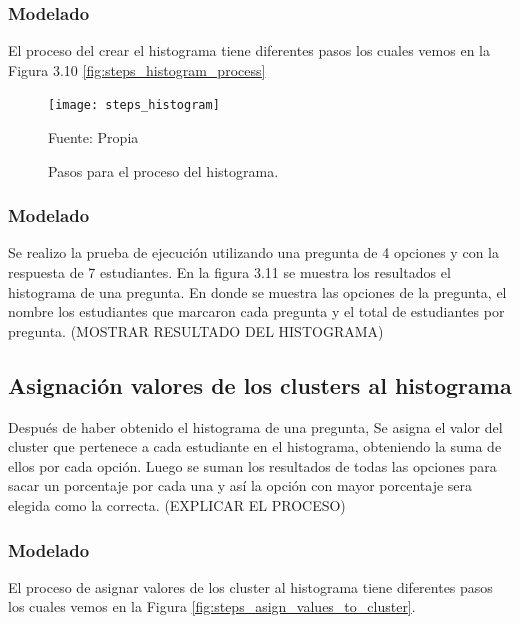 \subsubsection{Modelado}

El proceso del crear el histograma tiene diferentes pasos los cuales vemos en la Figura 3.10 \ref{fig:steps_histogram_process}

\begin{figure}[ht]
	\begin{center}
		\texttt{[image: steps\_histogram]}
	\end{center}
	\begin{center}
		\vskip -0.5cm
		\caption{\small{Pasos para el proceso del histograma.}}
		{\small{Fuente: Propia}}
	\end{center}
\end{figure}

\subsubsection{Modelado}

Se realizo la prueba de ejecución utilizando una pregunta de 4 opciones y con la respuesta de 7 estudiantes. En la figura 3.11 se muestra los resultados el histograma de una pregunta. En donde se muestra las opciones de la pregunta, el nombre los estudiantes que marcaron cada pregunta y el total de estudiantes por pregunta.
(MOSTRAR RESULTADO DEL HISTOGRAMA)

\subsection{Asignación valores de los clusters al histograma}

Después de haber obtenido el histograma de una pregunta, Se asigna el valor del cluster que pertenece a cada estudiante en el histograma, obteniendo la suma de ellos por cada opción. Luego se suman los resultados de todas las opciones para sacar un porcentaje por cada una y así la opción con mayor porcentaje sera elegida como la correcta. (EXPLICAR EL PROCESO)

\subsubsection{Modelado}

El proceso de asignar valores de los cluster al histograma tiene diferentes pasos los cuales vemos en la Figura \ref{fig:steps_asign_values_to_cluster}.


